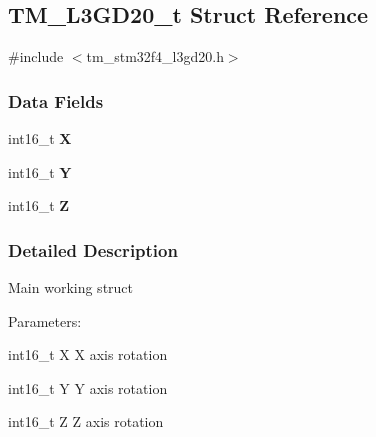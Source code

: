 \hypertarget{struct_t_m___l3_g_d20__t}{}\subsection{T\+M\+\_\+\+L3\+G\+D20\+\_\+t Struct Reference}
\label{struct_t_m___l3_g_d20__t}


{\ttfamily \#include $<$tm\+\_\+stm32f4\+\_\+l3gd20.\+h$>$}

\subsubsection*{Data Fields}
\begin{DoxyCompactItemize}
\item 
\hypertarget{struct_t_m___l3_g_d20__t_aa6aba27bc1a89db9e350b50bbf881f57}{}int16\+\_\+t {\bfseries X}\label{struct_t_m___l3_g_d20__t_aa6aba27bc1a89db9e350b50bbf881f57}

\item 
\hypertarget{struct_t_m___l3_g_d20__t_abe4637362df8e341470401813999dd17}{}int16\+\_\+t {\bfseries Y}\label{struct_t_m___l3_g_d20__t_abe4637362df8e341470401813999dd17}

\item 
\hypertarget{struct_t_m___l3_g_d20__t_a9a9188839f9d62a895b0371d08d0f22b}{}int16\+\_\+t {\bfseries Z}\label{struct_t_m___l3_g_d20__t_a9a9188839f9d62a895b0371d08d0f22b}

\end{DoxyCompactItemize}


\subsubsection{Detailed Description}
Main working struct

Parameters\+:
\begin{DoxyItemize}
\item int16\+\_\+t X X axis rotation
\item int16\+\_\+t Y Y axis rotation
\item int16\+\_\+t Z Z axis rotation 
\end{DoxyItemize}